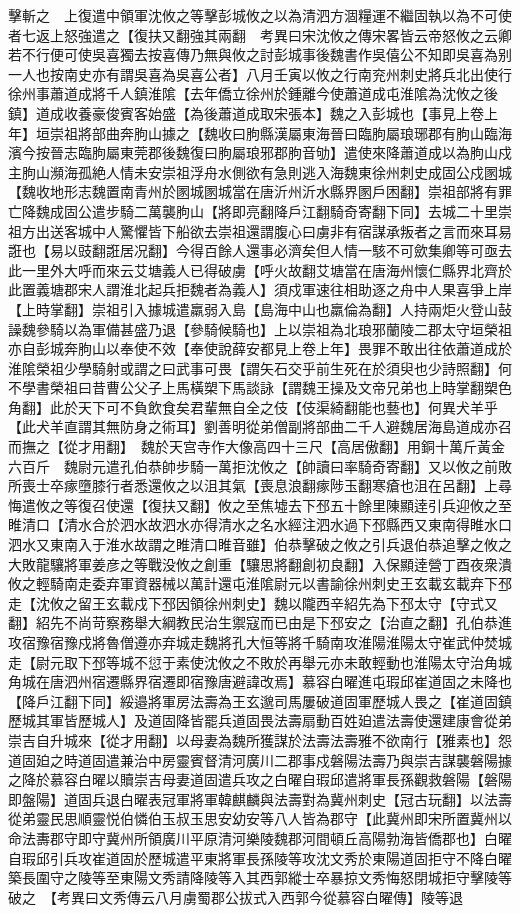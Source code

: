擊斬之　上復遣中領軍沈攸之等擊彭城攸之以為清泗方涸糧運不繼固執以為不可使者七返上怒強遣之【復扶又翻強其兩翻　考異曰宋沈攸之傳宋畧皆云帝怒攸之云卿若不行便可使吳喜獨去按喜傳乃無與攸之討彭城事後魏書作吳僖公不知即吳喜為别一人也按南史亦有謂吳喜為吳喜公者】八月壬寅以攸之行南兖州刺史將兵北出使行徐州事蕭道成將千人鎮淮隂【去年僑立徐州於鍾離今使蕭道成屯淮隂為沈攸之後鎮】道成收養豪俊賓客始盛【為後蕭道成取宋張本】魏之入彭城也【事見上卷上年】垣崇祖將部曲奔朐山據之【魏收曰胊縣漢屬東海晉曰臨朐屬琅琊郡有朐山臨海濱今按晉志臨朐屬東莞郡後魏復曰朐屬琅邪郡朐音劬】遣使來降蕭道成以為朐山戍主朐山瀕海孤絶人情未安崇祖浮舟水側欲有急則逃入海魏東徐州刺史成固公戍圂城【魏收地形志魏置南青州於圂城圂城當在唐沂州沂水縣界圂戶困翻】崇祖部將有罪亡降魏成固公遣步騎二萬襲朐山【將即亮翻降戶江翻騎奇寄翻下同】去城二十里崇祖方出送客城中人驚懼皆下船欲去崇祖還謂腹心曰虜非有宿謀承叛者之言而來耳易誑也【易以豉翻誑居况翻】今得百餘人還事必濟矣但人情一駭不可歛集卿等可亟去此一里外大呼而來云艾塘義人已得破虜【呼火故翻艾塘當在唐海州懷仁縣界北齊於此置義塘郡宋人謂淮北起兵拒魏者為義人】須戍軍速往相助逐之舟中人果喜爭上岸【上時掌翻】崇祖引入據城遣羸弱入島【島海中山也羸倫為翻】人持兩炬火登山鼔譟魏參騎以為軍備甚盛乃退【參騎候騎也】上以崇祖為北琅邪蘭陵二郡太守垣榮祖亦自彭城奔朐山以奉使不效【奉使說薛安都見上卷上年】畏罪不敢出往依蕭道成於淮隂榮祖少學騎射或謂之曰武事可畏【謂矢石交乎前生死在於須臾也少詩照翻】何不學書榮祖曰昔曹公父子上馬橫槊下馬談詠【謂魏王操及文帝兄弟也上時掌翻槊色角翻】此於天下可不負飲食矣君輩無自全之伎【伎渠綺翻能也藝也】何異犬羊乎【此犬羊直謂其無防身之術耳】劉善明從弟僧副將部曲二千人避魏居海島道成亦召而撫之【從才用翻】　魏於天宫寺作大像高四十三尺【高居傲翻】用銅十萬斤黃金六百斤　魏尉元遣孔伯恭帥步騎一萬拒沈攸之【帥讀曰率騎奇寄翻】又以攸之前敗所喪士卒瘃墮膝行者悉還攸之以沮其氣【喪息浪翻瘃陟玉翻寒瘡也沮在呂翻】上尋悔遣攸之等復召使還【復扶又翻】攸之至焦墟去下邳五十餘里陳顯逹引兵迎攸之至睢清口【清水合於泗水故泗水亦得清水之名水經注泗水過下邳縣西又東南得睢水口泗水又東南入于淮水故謂之睢清口睢音雖】伯恭擊破之攸之引兵退伯恭追擊之攸之大敗龍驤將軍姜彦之等戰没攸之創重【驤思將翻創初良翻】入保顯逹營丁酉夜衆潰攸之輕騎南走委弃軍資器械以萬計還屯淮隂尉元以書諭徐州刺史王玄載玄載弃下邳走【沈攸之留王玄載戍下邳因領徐州刺史】魏以隴西辛紹先為下邳太守【守式又翻】紹先不尚苛察務舉大綱教民治生禦寇而已由是下邳安之【治直之翻】孔伯恭進攻宿豫宿豫戍將魯僧遵亦弃城走魏將孔大恒等將千騎南攻淮陽淮陽太守崔武仲焚城走【尉元取下邳等城不愆于素使沈攸之不敗於再舉元亦未敢輕動也淮陽太守治角城角城在唐泗州宿遷縣界宿遷即宿豫唐避諱改焉】慕容白曜進屯瑕邱崔道固之未降也【降戶江翻下同】綏邉將軍房法壽為王玄邈司馬屢破道固軍歷城人畏之【崔道固鎮歷城其軍皆歷城人】及道固降皆罷兵道固畏法壽扇動百姓廹遣法壽使還建康會從弟崇吉自升城來【從才用翻】以母妻為魏所獲謀於法壽法壽雅不欲南行【雅素也】怨道固廹之時道固遣兼治中房靈賓督清河廣川二郡事戍磐陽法壽乃與崇吉謀襲磐陽據之降於慕容白曜以贖崇吉母妻道固遣兵攻之白曜自瑕邱遣將軍長孫觀救磐陽【磐陽即盤陽】道固兵退白曜表冠軍將軍韓麒麟與法壽對為冀州刺史【冠古玩翻】以法壽從弟靈民思順靈悦伯憐伯玉叔玉思安幼安等八人皆為郡守【此冀州即宋所置冀州以命法夀郡守即守冀州所領廣川平原清河樂陵魏郡河間頓丘高陽勃海皆僑郡也】白曜自瑕邱引兵攻崔道固於歷城遣平東將軍長孫陵等攻沈文秀於東陽道固拒守不降白曜築長圍守之陵等至東陽文秀請降陵等入其西郭縱士卒暴掠文秀悔怒閉城拒守擊陵等破之　【考異曰文秀傳云八月虜蜀郡公拔式入西郭今從慕容白曜傳】陵等退